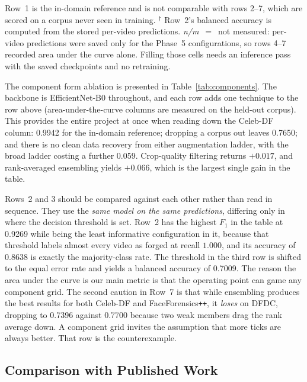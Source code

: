 \documentclass[journal,onecolumn]{IEEEtran}
\newcommand{\celebdf}{Celeb-DF}
\newcommand{\dfdc}{DFDC}
\newcommand{\nm}{\textit{\footnotesize n/m}}
\begin{document}
\begin{table}[!t]
\vspace{0.6ex}
\begin{minipage}{0.97\textwidth}
\footnotesize
Row~1 is the in-domain reference and is not comparable with rows 2--7, which are
scored on a corpus never seen in training. $^{\dagger}$ Row~2's balanced accuracy
is computed from the stored per-video predictions. \nm{}~$=$~not measured:
per-video predictions were saved only for the Phase~5 configurations, so rows
4--7 recorded area under the curve alone. Filling those cells needs an inference
pass with the saved checkpoints and no retraining.
\end{minipage}
\end{table}

The component form ablation is presented in Table~\ref{tab:components}. The backbone is EfficientNet-B0 throughout, and each row adds one technique to the row above (area-under-the-curve columns are measured on the held-out corpus). This provides the entire project at once when reading down the \celebdf{} column: 0.9942 for the in-domain reference; dropping a corpus out leaves 0.7650; and there is no clean data recovery from either augmentation ladder, with the broad ladder costing a further 0.059. Crop-quality filtering returns $+0.017$, and rank-averaged ensembling yields $+0.066$, which is the largest single gain in the table.

Rows~2 and 3 should be compared against each other rather than read in sequence. They use the \emph{same model on the same predictions}, differing only in where the decision threshold is set. Row~2 has the highest $F_1$ in the table at 0.9269 while being the least informative configuration in it, because that threshold labels almost every video as forged at recall $1.000$, and its accuracy of 0.8638 is exactly the majority-class rate. The threshold in the third row is shifted to the equal error rate and yields a balanced accuracy of 0.7009. The reason the area under the curve is our main metric is that the operating point can game any component grid. The second caution in Row~7 is that while ensembling produces the best results for both \celebdf{} and FaceForensics\texttt{++}, it \emph{loses} on \dfdc{}, dropping to 0.7396 against 0.7700 because two weak members drag the rank average down. A component grid invites the assumption that more ticks are always better. That row is the counterexample.

\subsection{Comparison with Published Work}
\end{document}
